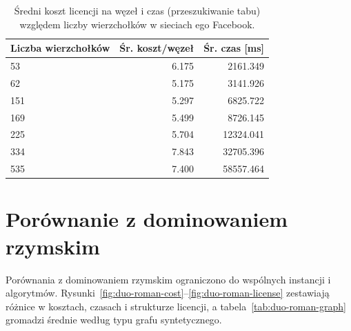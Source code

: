\begin{table}[H]
  \centering
  \caption{Średni koszt licencji na węzeł i czas (przeszukiwanie tabu) względem liczby wierzchołków w sieciach ego Facebook.}
  \label{tab:duo-real-size-table}
  \begin{tabular}{lrr}
    \toprule
    \textbf{Liczba wierzchołków} & \textbf{Śr. koszt/węzeł} & \textbf{Śr. czas [ms]} \\
    \midrule
    53                           & 6.175                    & 2161.349               \\
    62                           & 5.175                    & 3141.926               \\
    151                          & 5.297                    & 6825.722               \\
    169                          & 5.499                    & 8726.145               \\
    225                          & 5.704                    & 12324.041              \\
    334                          & 7.843                    & 32705.396              \\
    535                          & 7.400                    & 58557.464              \\
    \bottomrule
  \end{tabular}
\end{table}


\section{Porównanie z dominowaniem rzymskim}

Porównania z dominowaniem rzymskim ograniczono do wspólnych instancji i algorytmów. Rysunki~\ref{fig:duo-roman-cost}--\ref{fig:duo-roman-license} zestawiają różnice w kosztach, czasach i strukturze licencji, a tabela~\ref{tab:duo-roman-graph} gromadzi średnie według typu grafu syntetycznego.

